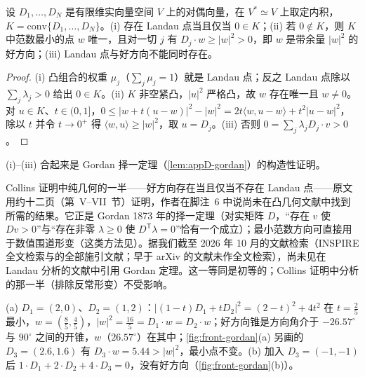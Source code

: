 \begin{lemma}\label{lem:front-min-norm}
设 $D_1,\dots,D_N$ 是有限维实向量空间 $V$ 上的对偶向量，在 $V^*\simeq V$ 上取定内积，$K=\mathrm{conv}\{D_1,\dots,D_N\}$。(i) 存在 Landau 点当且仅当 $0\in K$；(ii) 若 $0\notin K$，则 $K$ 中范数最小的点 $w$ 唯一，且对一切 $j$ 有 $D_j\cdot w\ge|w|^2>0$，即 $w$ 是带余量 $|w|^2$ 的好方向；(iii) Landau 点与好方向不能同时存在。
\end{lemma}

\begin{proof}
(i) 凸组合的权重 $\mu_j$（$\sum_j\mu_j=1$）就是 Landau 点；反之 Landau 点除以 $\sum_j\lambda_j>0$ 给出 $0\in K$。(ii) $K$ 非空紧凸，$|u|^2$ 严格凸，故 $w$ 存在唯一且 $w\ne0$。对 $u\in K$、$t\in(0,1]$，$0\le|w+t(u-w)|^2-|w|^2=2t\langle w,u-w\rangle+t^2|u-w|^2$，除以 $t$ 并令 $t\to0^+$ 得 $\langle w,u\rangle\ge|w|^2$，取 $u=D_j$。(iii) 否则 $0=\sum_j\lambda_jD_j\cdot v>0$。
\end{proof}

(i)--(iii) 合起来是 Gordan 择一定理（\cref{lem:appD-gordan}）的构造性证明。

\begin{remark}\label{rem:front-gordan-collins}
Collins 证明中纯几何的一半——好方向存在当且仅当不存在 Landau 点\cite[定理~3]{Collins:2020euz}——原文用约十二页（第~V--VII~节）证明，作者在脚注~6 中说尚未在凸几何文献中找到所需的结果。它正是 Gordan 1873 年的择一定理\cite{Gordan1873}（对实矩阵 $D$，“存在 $v$ 使 $Dv>0$”与“存在非零 $\lambda\ge0$ 使 $D^{\mathsf T}\lambda=0$”恰有一个成立）；最小范数方向可直接用于数值围道形变（这类方法见\cite{Gong:2008ww,Becker:2012nk}）。据我们截至 2026 年 10 月的文献检索（INSPIRE 全文检索与\cite{Collins:2020euz}的全部施引文献；早于 arXiv 的文献未作全文检索），尚未见在 Landau 分析的文献中引用 Gordan 定理。这一等同是初等的；Collins 证明中分析的那一半（排除反常形变）不受影响。
\end{remark}

\begin{example}[二维中的两种情形]\label{ex:front-gordan-2d}
(a) $D_1=(2,0)$、$D_2=(1,2)$：$|(1-t)D_1+tD_2|^2=(2-t)^2+4t^2$ 在 $t=\frac25$ 最小，$w=(\frac85,\frac45)$，$|w|^2=\frac{16}5=D_1\cdot w=D_2\cdot w$；好方向锥是方向角介于 $-26.57^\circ$ 与 $90^\circ$ 之间的开锥，$w$（$26.57^\circ$）在其中；\cref{fig:front-gordan}(a) 另画的 $D_3=(2.6,1.6)$ 有 $D_3\cdot w=5.44>|w|^2$，最小点不变。(b) 加入 $D_3=(-1,-1)$ 后 $1\cdot D_1+2\cdot D_2+4\cdot D_3=0$，没有好方向（\cref{fig:front-gordan}(b)）。
\end{example}

